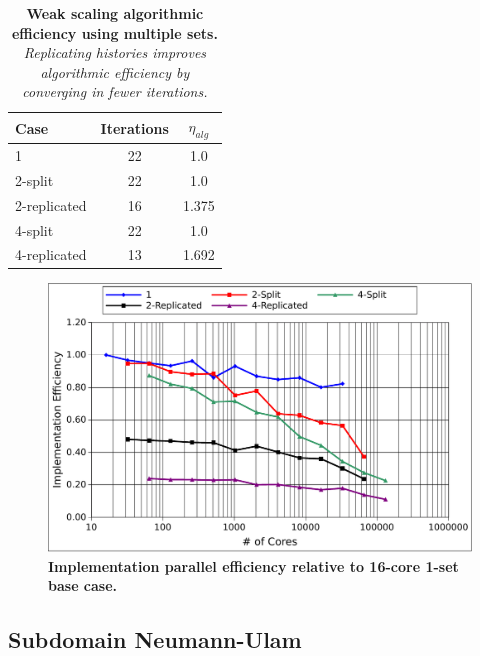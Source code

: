 \begin{table}[h!]
  \begin{center}
    \begin{tabular}{lcc}\hline\hline
      \multicolumn{1}{l}{Case}& 
      \multicolumn{1}{c}{Iterations}&
      \multicolumn{1}{c}{$\eta_{alg}$} \\\hline
      1 & 22 & 1.0 \\
      2-split & 22 & 1.0 \\
      2-replicated & 16 & 1.375 \\
      4-split & 22 & 1.0 \\
      4-replicated & 13 & 1.692 \\
      \hline\hline
    \end{tabular}
  \end{center}
  \caption{\textbf{Weak scaling algorithmic efficiency using multiple
      sets.} \textit{Replicating histories improves algorithmic
      efficiency by converging in fewer iterations.}}
  \label{tab:ms_weak_alg_eff}
\end{table}

\begin{figure}[t!]
  \begin{center}
    \includegraphics[width=6in]{chapters/parallel_mc/titan_weak_ms_impeff.pdf}
  \end{center}
  \caption{\textbf{Implementation parallel efficiency relative to 16-core
      1-set base case.}}
  \label{fig:titan_weak_ms_impeff}
\end{figure}

\clearpage

\subsection{Subdomain Neumann-Ulam}
\label{subsec:full_clip}


